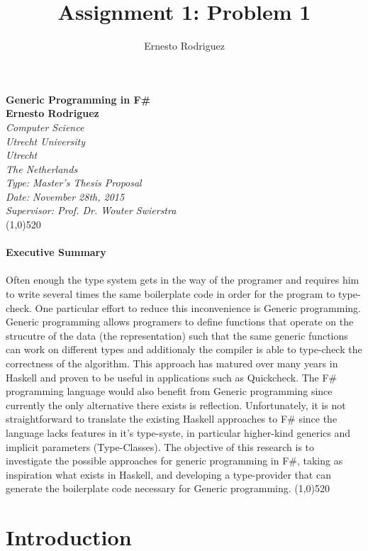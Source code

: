 \documentclass[8pt]{extarticle}
\title{Assignment 1: Problem 1}
\author{Ernesto Rodriguez}
\begin{document}
\Huge{\bf Generic Programming in F\#\\[1cm]}
\large{\bf Ernesto Rodriguez\\[0.5cm]}
\emph{Computer Science \\ Utrecht University \\ Utrecht \\ The Netherlands \\[0.5cm]}
\emph{Type: Master's Thesis Proposal \\ Date: November 28th, 2015 \\ Supervisor: Prof. Dr. Wouter Swierstra\\}
\line(1,0){520}\\ \\
\Large{\bf Executive Summary\\ \\}
Often enough the type system gets in the way of the programer and requires him to write several times the same boilerplate code in order for the program to type-check. One particular effort to reduce this inconvenience is Generic programming. Generic programming allows programers to define functions that operate on the strucutre of the data (the representation) such that the same generic functions can work on different types and additionaly the compiler is able to type-check the correctness of the algorithm. This approach has matured over many years in Haskell and proven to be useful in applications such as Quickcheck. The F\# programming language would also benefit from Generic programming since currently the only alternative there exists is reflection. Unfortunately, it is not straightforward to translate the existing Haskell approaches to F\# since the language lacks features in it's type-syste, in particular higher-kind generics and implicit parameters (Type-Classes). The objective of this research is to investigate the possible approaches for generic programming in F\#, taking as inspiration what exists in Haskell, and developing a type-provider that can generate the boilerplate code necessary for Generic programming.
\line(1,0){520}
\section{Introduction}
\end{document}
